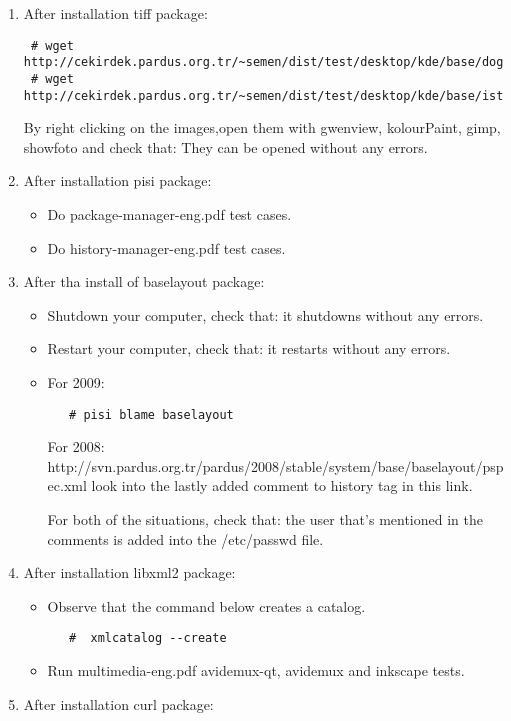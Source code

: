 \documentclass[a4paper,10pt]{article}
\begin{document}
\begin{enumerate}
\begin{itemize}
\end{itemize}
\item After installation  tiff package:
\begin{verbatim}
 # wget http://cekirdek.pardus.org.tr/~semen/dist/test/desktop/kde/base/doga.tiff
 # wget http://cekirdek.pardus.org.tr/~semen/dist/test/desktop/kde/base/istanbul.tiff
\end{verbatim}

By right clicking on the images,open them with gwenview, kolourPaint, gimp, showfoto and check that: They can be opened without any errors.
\item After installation  pisi package:
\begin{itemize}
 \item Do package-manager-eng.pdf test cases.
 \item Do history-manager-eng.pdf test cases.
\end{itemize}
\item After tha install of baselayout package:
\begin{itemize}
 \item Shutdown your computer, check that: it shutdowns without any errors.
 \item Restart your computer, check that: it restarts without any errors.
 \item For 2009:
  \begin{verbatim}
   # pisi blame baselayout
  \end{verbatim}
      For 2008: http://svn.pardus.org.tr/pardus/2008/stable/system/base/baselayout/pspec.xml  look into the lastly added comment to history tag in this link.

   For both of the situations, check that: the user that's mentioned in the comments is added into the /etc/passwd file.

\end{itemize}
\item After installation  libxml2 package:

\begin{itemize}
\item Observe that the command below creates a catalog.
  \begin{verbatim}
   #  xmlcatalog --create
  \end{verbatim}
\item Run multimedia-eng.pdf avidemux-qt, avidemux and inkscape tests.
\end{itemize}
\item After installation  curl package:


\end{enumerate}
\end{document}
